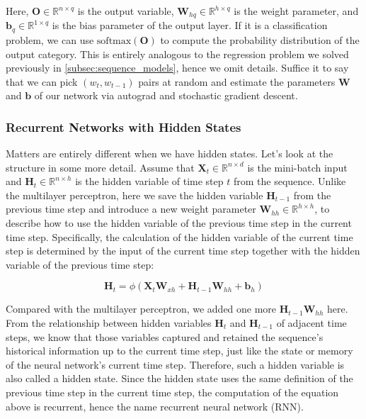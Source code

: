 Here, $\mathbf{O} \in \mathbb{R}^{n \times q}$ is the output variable,
$\mathbf{W}_{hq} \in \mathbb{R}^{h \times q}$ is the weight parameter, and
$\mathbf{b}_q \in \mathbb{R}^{1 \times q}$ is the bias parameter of the output
layer.  If it is a classification problem, we can use
$\text{softmax}(\mathbf{O})$ to compute the probability distribution of the
output category. This is entirely analogous to the regression problem we solved
previously in \cref{subsec:sequence_models}, hence we omit details. Suffice it to say that we can pick $(w_t, w_{t-1})$ pairs at random and estimate the parameters $\mathbf{W}$ and $\mathbf{b}$ of our network via autograd and stochastic gradient descent.

\subsubsection{Recurrent Networks with Hidden States}

Matters are entirely different when we have hidden states. Let's look at the structure in some more detail. Assume that $\mathbf{X}_t \in \mathbb{R}^{n \times d}$ is the mini-batch input and $\mathbf{H}_t  \in \mathbb{R}^{n \times h}$ is the hidden variable of time step $t$ from the sequence.  Unlike the multilayer perceptron, here we save the hidden variable $\mathbf{H}_{t-1}$ from the previous time step and introduce a new weight parameter $\mathbf{W}_{hh} \in \mathbb{R}^{h \times h}$, to describe how to use the hidden variable of the previous time step in the current time step. Specifically, the calculation of the hidden variable of the current time step is determined by the input of the current time step together with the hidden variable of the previous time step:

$$\mathbf{H}_t = \phi(\mathbf{X}_t \mathbf{W}_{xh} + \mathbf{H}_{t-1} \mathbf{W}_{hh}  + \mathbf{b}_h)$$

Compared with the multilayer perceptron, we added one more $\mathbf{H}_{t-1} \mathbf{W}_{hh}$ here. From the relationship between hidden variables $\mathbf{H}_t$ and $\mathbf{H}_{t-1}$ of adjacent time steps, we know that those variables captured and retained the sequence's historical information up to the current time step, just like the state or memory of the neural network's current time step. Therefore, such a hidden variable is also called a hidden state. Since the hidden state uses the same definition of the previous time step in the current time step, the computation of the equation above is recurrent, hence the name recurrent neural network (RNN).

